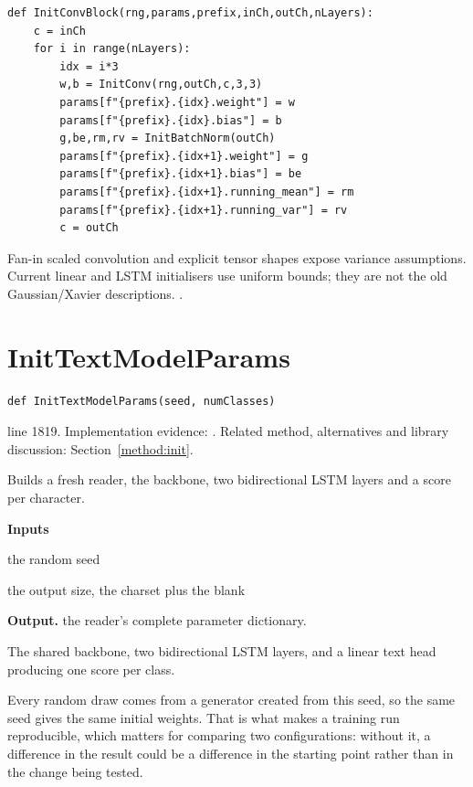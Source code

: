 \begin{lstlisting}[style=plain]
def InitConvBlock(rng,params,prefix,inCh,outCh,nLayers):
    c = inCh
    for i in range(nLayers):
        idx = i*3
        w,b = InitConv(rng,outCh,c,3,3)
        params[f"{prefix}.{idx}.weight"] = w
        params[f"{prefix}.{idx}.bias"] = b
        g,be,rm,rv = InitBatchNorm(outCh)
        params[f"{prefix}.{idx+1}.weight"] = g
        params[f"{prefix}.{idx+1}.bias"] = be
        params[f"{prefix}.{idx+1}.running_mean"] = rm
        params[f"{prefix}.{idx+1}.running_var"] = rv
        c = outCh
\end{lstlisting}
Fan-in scaled convolution and explicit tensor shapes expose variance assumptions. Current linear and LSTM initialisers use uniform bounds; they are not the old Gaussian/Xavier descriptions. \cite{he2015,glorot2010,torchlstm,torchlinear}.


\section{InitTextModelParams}\label{fn:train:InitTextModelParams}
\begin{lstlisting}[style=sig]
def InitTextModelParams(seed, numClasses)
\end{lstlisting}
 line 1819. Implementation evidence: \cite{code2026}. Related method, alternatives and library discussion: Section~\ref{method:init}.


Builds a fresh reader, the backbone, two bidirectional LSTM layers and a score per character.




\noindent\textbf{Inputs}
\begin{description}[leftmargin=2.2em,style=nextline,font=\normalfont\ttfamily]\setlength\itemsep{1pt}
  \item[{seed}] \normalfont the random seed
  \item[{numClasses}] \normalfont the output size, the charset plus the blank
\end{description}

\noindent\textbf{Output.} the reader's complete parameter dictionary.


The shared backbone, two bidirectional LSTM layers, and a linear text head producing one score per class.


Every random draw comes from a generator created from this seed, so the same seed gives the same initial weights. That is what makes a training run reproducible, which matters for comparing two configurations: without it, a difference in the result could be a difference in the starting point rather than in the change being tested.


